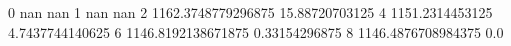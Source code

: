 0 nan nan
1 nan nan
2 1162.3748779296875 15.88720703125
4 1151.2314453125 4.7437744140625
6 1146.8192138671875 0.33154296875
8 1146.4876708984375 0.0
